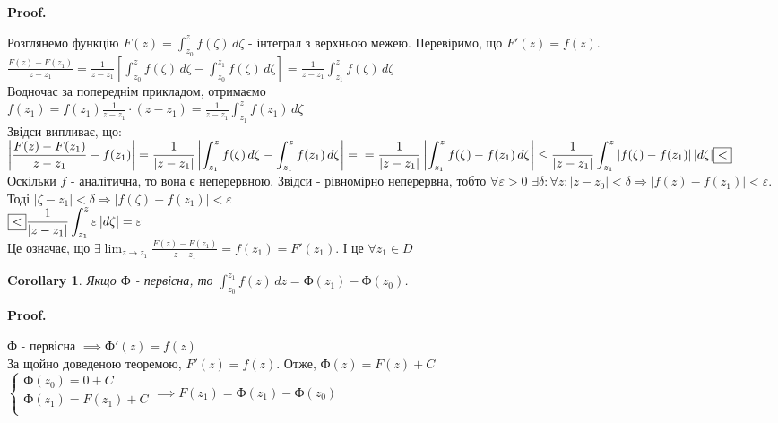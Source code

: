 \documentclass[a4paper, 10pt]{article}
\makeatletter
\def\qed{$\blacksquare$}
\theoremstyle{theoremdd}
\theoremstyle{theoremdd}
\theoremstyle{theoremdd}
\theoremstyle{theoremdd}
\theoremstyle{theoremdd}
\theoremstyle{theoremdd}
\theoremstyle{theoremdd}
\theoremstyle{theoremdd}
\newtheorem{corollary}[theorem]{Corollary}
\renewenvironment{proof}[1][Proof.\\]{\par
\pushQED{\hfill \qed}%
\normalfont \topsep6\p@\@plus6\p@\relax
\trivlist
\item\relax
{\bfseries
#1\@addpunct{.}}\hspace\labelsep\ignorespaces
}{%
\popQED\endtrivlist\@endpefalse
}
\makeatother
\begin{document}
\begin{proof}
Розглянемо функцію $F(z)=\displaystyle \int_{z_0}^z f(\zeta)\,d\zeta$ - інтеграл з верхньою межею. Перевіримо, що $F'(z)=f(z)$.\\
	$\displaystyle \frac{F(z)-F(z_1)}{z-z_1} = \frac{1}{z-z_1} \left[ \int_{z_0}^z f(\zeta)\,d\zeta - \int_{z_0}^{z_1} f(\zeta)\,d\zeta \right] = \frac{1}{z-z_1} \int_{z_1}^z f(\zeta)\,d\zeta$\\
Водночас за попереднім прикладом, отримаємо\\
	$\displaystyle f(z_1)=f(z_1)\frac{1}{z-z_1}\cdot(z-z_1)=\frac{1}{z-z_1} \int_{z_1}^z f(z_1)\,d\zeta$\\
Звідси випливає, що:\\
$\displaystyle \left\lvert \frac{F(z)-F(z_1)}{z-z_1} - f(z_1) \right\rvert = \frac{1}{|z-z_1|} \left\lvert \int_{z_1}^z f(\zeta)\,d\zeta - \int_{z_1}^z f(z_1)\,d\zeta \right\rvert =\\= \frac{1}{|z-z_1|} \left\lvert \int_{z_1}^z f(\zeta)-f(z_1)\,d\zeta \right\rvert \leq \frac{1}{|z-z_1|} \int_{z_1}^z |f(\zeta)-f(z_1)|\,|d\zeta|\fbox{<}$\\
	Оскільки $f$ - аналітична, то вона є неперервною. Звідси - рівномірно неперервна, тобто $\forall \varepsilon>0$ $\exists \delta: \forall z: |z-z_0|<\delta \Rightarrow |f(z)-f(z_1)|<\varepsilon$. Тоді $|\zeta - z_1|<\delta \Rightarrow |f(\zeta)-f(z_1)|<\varepsilon$\\
	$\displaystyle \fbox{<} \frac{1}{|z-z_1|} \int_{z_1}^z \varepsilon \,|d\zeta| = \varepsilon$\\
	Це означає, що $\displaystyle \exists \lim_{z\to z_1} \frac{F(z)-F(z_1)}{z-z_1}=f(z_1)=F'(z_1)$. І це $\forall z_1 \in D$
\end{proof}
	
\begin{corollary}
Якщо $\textrm{Ф}$ - первісна, то $\displaystyle \int_{z_0}^{z_1} f(z)\,dz = \textrm{Ф}(z_1)-\textrm{Ф}(z_0)$.
\end{corollary}

\begin{proof}
$\textrm{Ф}$ - первісна $\implies \textrm{Ф}'(z)=f(z)$\\
За щойно доведеною теоремою, $F'(z)=f(z)$. Отже, $\textrm{Ф}(z)=F(z)+C$\\
$\begin{cases}
	\textrm{Ф}(z_0) = 0 + C\\
	\textrm{Ф}(z_1) = F(z_1) + C\\
\end{cases} \implies F(z_1)=\textrm{Ф}(z_1)-\textrm{Ф}(z_0)$
\end{proof}
\end{document}
